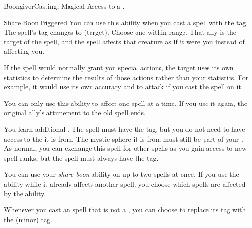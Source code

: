   \begin{magicalfeat}{Boongiver}{Casting, Magical}
    \featpre Access to a .

    \begin{magicaltriggeredability}{Share Boon}{Triggered}
      \rankline
      You can use this ability when you cast a spell with the  tag.
      The spell's  tag changes to  (target).
      Choose one  within \rngmed range.
      That ally is the target of the spell, and the spell affects that creature as if it were you instead of affecting you.

      If the spell would normally grant you special actions, the target uses its own statistics to determine the results of those actions rather than your statistics.
      For example, it would use its own accuracy and  to attack if you cast the  spell on it.

      You can only use this ability to affect one spell at a time.
      If you use it again, the original ally's attunement to the old spell ends.
    \end{magicaltriggeredability}

     You learn additional .
    The spell must have the  tag, but you do not need to have access to the  it is from.
    The mystic sphere it is from must still be part of your .
    As normal, you can exchange this spell for other spells as you gain access to new spell ranks, but the spell must always have the  tag.

     You can use your \textit{share boon} ability on up to two spells at once.
    If you use the ability while it already affects another spell, you choose which spells are affected by the ability.

     Whenever you cast an  spell that is not a , you can choose to replace its  tag with the  (minor) tag.
  \end{magicalfeat}

